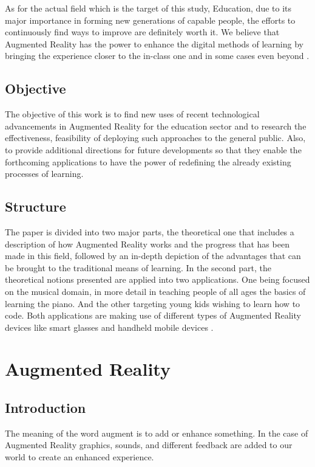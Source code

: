 \documentclass[12 pct]{report}
\begin{document}
As for the actual field which is the target of this study, Education, due to its major importance in forming new generations of capable people, the efforts to continuously find ways to improve are definitely worth it. 
We believe that Augmented Reality has the power to enhance the digital methods of learning by bringing the experience closer to the in-class one and in some cases even beyond \cite{wu2013current}.

\section{Objective}
The objective of this work is to find new uses of recent technological advancements in Augmented Reality for the education sector and to research the effectiveness, feasibility of deploying such approaches to the general public. Also, to provide additional directions for future developments so that they enable the forthcoming applications to have the power of redefining the already existing processes of learning.

\section{Structure}
The paper is divided into two major parts, the theoretical one that includes a description of how Augmented Reality works and the progress that has been made in this field, followed by an in-depth depiction of the advantages that can be brought to the traditional means of learning. 
In the second part, the theoretical notions presented are applied into two applications.
One being focused on the musical domain, in more detail in teaching people of all ages the basics of learning the piano.
And the other targeting young kids wishing to learn how to code. 
Both applications are making use of different types of Augmented Reality devices like smart glasses \cite{rauschnabel2016augmented} and handheld mobile devices \cite{wagner2005towards}.

\chapter{Augmented Reality}

\section{Introduction}
The meaning of the word augment is to add or enhance something. In the case of Augmented Reality \cite{milgram1995augmented} graphics, sounds, and different feedback are added to our world to create an enhanced experience.
\end{document}
